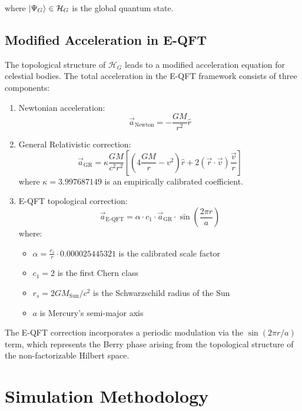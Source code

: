\documentclass[11pt]{article}
\theoremstyle{definition}
\begin{document}
where $\ket{\Psi_G} \in \mathcal{H}_G$ is the global quantum state.

\subsection{Modified Acceleration in E-QFT}

The topological structure of $\mathcal{H}_G$ leads to a modified acceleration equation for celestial bodies. The total acceleration in the E-QFT framework consists of three components:

\begin{enumerate}
	\item Newtonian acceleration:
	\begin{equation}
	\vec{a}_{\text{Newton}} = -\frac{GM}{r^2}\hat{r}
	\end{equation}
	
	\item General Relativistic correction:
	\begin{equation}
	\vec{a}_{\text{GR}} = \kappa\frac{GM}{c^2 r^2}\left[\left(4\frac{GM}{r} - v^2\right)\hat{r} + 2(\vec{r}\cdot\vec{v})\frac{\vec{v}}{r}\right]
	\end{equation}
	where $\kappa = 3.997687149$ is an empirically calibrated coefficient.
	
	\item E-QFT topological correction:
	\begin{equation}
	\vec{a}_{\text{E-QFT}} = \alpha \cdot c_1 \cdot \vec{a}_{\text{GR}} \cdot \sin\left(\frac{2\pi r}{a}\right)
	\end{equation}
	where:
	\begin{itemize}
		\item $\alpha = \frac{r_s}{r} \cdot 0.000025445321$ is the calibrated scale factor
		\item $c_1 = 2$ is the first Chern class
		\item $r_s = 2GM_{\text{Sun}}/c^2$ is the Schwarzschild radius of the Sun
		\item $a$ is Mercury's semi-major axis
	\end{itemize}
\end{enumerate}

The E-QFT correction incorporates a periodic modulation via the $\sin(2\pi r/a)$ term, which represents the Berry phase arising from the topological structure of the non-factorizable Hilbert space.

\section{Simulation Methodology}
\end{document}
